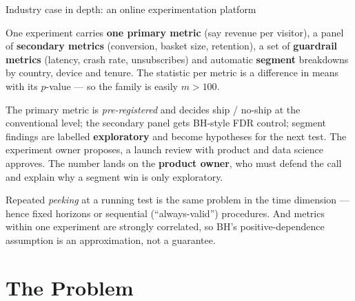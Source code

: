 \documentclass[aspectratio=169,11pt]{beamer}
\begin{document}
\begin{frame}{Industry case in depth: an online experimentation platform}
  \footnotesize
  \begin{industry}
    One experiment carries \textbf{one primary metric} (say revenue per visitor), a panel of
    \textbf{secondary metrics} (conversion, basket size, retention), a set of
    \textbf{guardrail metrics} (latency, crash rate, unsubscribes) and automatic
    \textbf{segment} breakdowns by country, device and tenure. The statistic per metric is a
    difference in means with its $p$-value --- so the family is easily $m>100$.
  \end{industry}
  \begin{readme}
    The primary metric is \emph{pre-registered} and decides ship / no-ship at the
    conventional level; the secondary panel gets BH-style FDR control; segment findings are
    labelled \textbf{exploratory} and become hypotheses for the next test. The experiment
    owner proposes, a launch review with product and data science approves. The number lands
    on the \textbf{product owner}, who must defend the call and explain why a segment win is
    only exploratory.
  \end{readme}
  \begin{takeaway}
    Repeated \emph{peeking} at a running test is the same problem in the time dimension ---
    hence fixed horizons or sequential (``always-valid'') procedures. And metrics within one
    experiment are strongly correlated, so BH's positive-dependence assumption is an
    approximation, not a guarantee.
  \end{takeaway}
\end{frame}

\section{The Problem}
\end{document}
